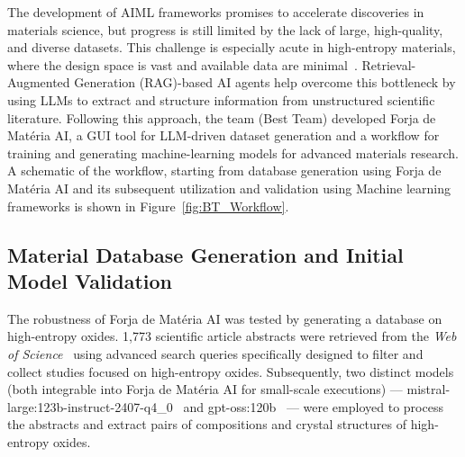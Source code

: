 The development of AIML frameworks promises to accelerate discoveries in materials science, but progress is still limited by the lack of large, high-quality, and diverse datasets. This challenge is especially acute in high-entropy materials, where the design space is vast and available data are minimal~\cite{Zhang2023}. Retrieval-Augmented Generation (RAG)-based AI agents help overcome this bottleneck by using LLMs to extract and structure information from unstructured scientific literature. Following this approach, the team (Best Team) developed Forja de Mat\'{e}ria AI, a GUI tool for LLM-driven dataset generation and a workflow for training and generating machine-learning models for advanced materials research. A schematic of the workflow, starting from database generation using Forja de Mat\'{e}ria AI and its subsequent utilization and validation using Machine learning frameworks is shown in Figure~\ref{fig:BT_Workflow}.
\subsection*{Material Database Generation and Initial Model Validation}
The robustness of Forja de Mat\'{e}ria AI was tested by generating a database on high-entropy oxides. 1{,}773 scientific article abstracts were retrieved from the \textit{Web of Science}~\cite{webofscience} using advanced search queries specifically designed to filter and collect studies focused on high-entropy oxides. Subsequently, two distinct models (both integrable into Forja de Mat\'{e}ria AI for small-scale executions) --- \textsf{mistral-large:123b-instruct-2407-q4\_0}~\cite{mistral_large_123b_instruct_2407_q4_0} and \textsf{gpt-oss:120b}~\cite{gpt_oss_120b} --- were employed to process the abstracts and extract pairs of compositions and crystal structures of high-entropy oxides. \\

